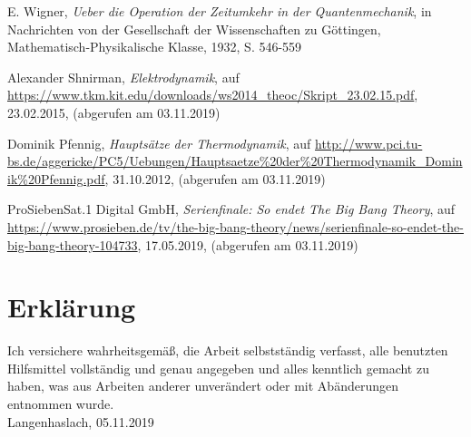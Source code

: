 \documentclass[12pt,a4paper]{scrartcl}
\numberwithin{equation}{section}
\begin{document}
\begin{thebibliography}{99}
  E. Wigner,
  \textit{Ueber die Operation der Zeitumkehr in der Quantenmechanik},
  in Nachrichten von der Gesellschaft der Wissenschaften zu Göttingen, Mathematisch-Physikalische Klasse,
  1932,
  S. 546-559

  Alexander Shnirman,
  \textit{Elektrodynamik},
  auf \url{https://www.tkm.kit.edu/downloads/ws2014_theoc/Skript_23.02.15.pdf},
  23.02.2015,
  (abgerufen am 03.11.2019)

  Dominik Pfennig,
  \textit{Hauptsätze der Thermodynamik},
  auf \url{http://www.pci.tu-bs.de/aggericke/PC5/Uebungen/Hauptsaetze%20der%20Thermodynamik_Dominik%20Pfennig.pdf},
  31.10.2012,
  (abgerufen am 03.11.2019)

  ProSiebenSat.1 Digital GmbH,
  \textit{Serienfinale: So endet The Big Bang Theory},
  auf \url{https://www.prosieben.de/tv/the-big-bang-theory/news/serienfinale-so-endet-the-big-bang-theory-104733},
  17.05.2019,
  (abgerufen am 03.11.2019)


\end{thebibliography}



\newpage

 \thispagestyle{empty}


\vspace*{8cm}


\section*{Erklärung}

Ich  versichere  wahrheitsgemäß,  die  Arbeit selbstständig verfasst,  alle  benutzten  Hilfsmittel  vollständig  und  genau  angegeben  und  alles kenntlich  gemacht  zu  haben,  was  aus  Arbeiten  anderer  unverändert  oder  mit  Abänderungen entnommen  wurde.
\\[2ex]

\noindent
Langenhaslach, 05.11.2019\\[5ex]
\end{document}
